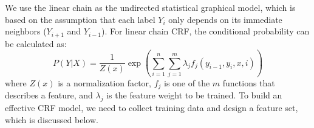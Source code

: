 We use the linear chain as the undirected statistical graphical model,
which is based on the assumption that each label $Y_{i}$ only depends on
its immediate neighbors ($Y_{i+1}$ and $Y_{i-1}$).
For linear chain CRF, the conditional probability can be calculated as:
\begin{equation*}
    P(Y|X)=\frac{1}{Z(x)}\exp(\sum_{i=1}^{n}\sum_{j=1}^{m}\lambda_{j}f_{j}(y_{i-1},y_{i},x,i))
\end{equation*}
where $Z(x)$ is a normalization factor, $f_{j}$ is one of the $m$
functions that describes a feature, and $\lambda_{j}$ is the feature
weight to be trained.
To build an effective CRF model, we need to collect training data and
design a feature set, which is discussed below.



%
%
%
%
%
%
%


